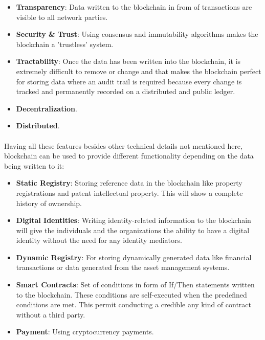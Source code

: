 \documentclass[runningheads]{llncs}
\begin{document}
\begin{itemize}
    \item \textbf{Transparency}: Data written to the blockchain in from of transactions are visible to all network parties.
    \item \textbf{Security \& Trust}: Using consensus and immutability algorithms makes the blockchain a 'trustless' system. 
    \item \textbf{Tractability}: Once the data has been written into the blockchain, it is extremely difficult to remove or change and that makes the blockchain perfect for storing data where an audit trail is required because every change is tracked and permanently recorded on a distributed and public ledger.
    \item \textbf{Decentralization}.
    \item \textbf{Distributed}.
\end{itemize}

\paragraph{}
Having all these features besides other technical details not mentioned here, blockchain can be used to provide different functionality depending on the data being written to it:

\begin{itemize}
\item \textbf{Static Registry}: Storing reference data in the blockchain like property registrations and patent intellectual property. This will show a complete history of ownership.
\item \textbf{Digital Identities}: Writing identity-related information to the blockchain will give the individuals and the organizations the ability to have a digital identity without the need for any identity mediators.
\item \textbf{Dynamic Registry}:  For storing dynamically generated data like financial transactions or data generated from the asset management systems.
\item \textbf{Smart Contracts}: Set of conditions in form of If/Then statements written to the blockchain. These conditions are self-executed when the predefined conditions are met. This permit conducting a credible any kind of contract without a third party.
\item \textbf{Payment}: Using cryptocurrency payments.
\end{itemize}
\end{document}
